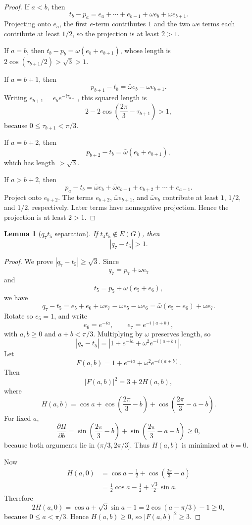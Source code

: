 \documentclass[11pt]{article}
\newtheorem{lemma}{Lemma}
\begin{document}
\begin{proof}
If $a<b$, then
\[
  t_b-p_a=e_a+\cdots+e_{b-1}+\omega e_b+\omega e_{b+1}.
\]
Projecting onto $e_a$, the first $e$-term contributes $1$ and the two $\omega e$ terms each contribute at least $1/2$, so the projection is at least $2>1$.

If $a=b$, then $t_b-p_b=\omega(e_b+e_{b+1})$, whose length is $2\cos(\tau_{b+1}/2)>\sqrt3>1$.

If $a=b+1$, then
\[
  p_{b+1}-t_b=\bar\omega e_b-\omega e_{b+1}.
\]
Writing $e_{b+1}=e_b e^{-i\tau_{b+1}}$, this squared length is
\[
  2-2\cos\left(\frac{2\pi}{3}-\tau_{b+1}\right)>1,
\]
because $0\le\tau_{b+1}<\pi/3$.

If $a=b+2$, then
\[
  p_{b+2}-t_b=\bar\omega(e_b+e_{b+1}),
\]
which has length $>\sqrt3$.

If $a>b+2$, then
\[
  p_a-t_b=\bar\omega e_b+\bar\omega e_{b+1}+e_{b+2}+\cdots+e_{a-1}.
\]
Project onto $e_{b+2}$. The terms $e_{b+2}$, $\bar\omega e_{b+1}$, and $\bar\omega e_b$ contribute at least $1$, $1/2$, and $1/2$, respectively. Later terms have nonnegative projection. Hence the projection is at least $2>1$.
\end{proof}

\begin{lemma}[$q_7t_5$ separation]\label{lem:q7t5}
If $t_4t_5\notin E(G)$, then
\[
  |q_7-t_5|>1.
\]
\end{lemma}

\begin{proof}
We prove $|q_7-t_5|\ge\sqrt3$. Since
\[
  q_7=p_7+\omega e_7
\]
and
\[
  t_5=p_5+\omega(e_5+e_6),
\]
we have
\[
  q_7-t_5=e_5+e_6+\omega e_7-\omega e_5-\omega e_6=\bar\omega(e_5+e_6)+\omega e_7.
\]
Rotate so $e_5=1$, and write
\[
  e_6=e^{-ia},\qquad e_7=e^{-i(a+b)},
\]
with $a,b\ge0$ and $a+b<\pi/3$. Multiplying by $\omega$ preserves length, so
\[
  |q_7-t_5|=|1+e^{-ia}+\omega^2e^{-i(a+b)}|.
\]
Let
\[
  F(a,b)=1+e^{-ia}+\omega^2e^{-i(a+b)}.
\]
Then
\[
  |F(a,b)|^2=3+2H(a,b),
\]
where
\[
  H(a,b)=\cos a+\cos\left(\frac{2\pi}{3}-b\right)+\cos\left(\frac{2\pi}{3}-a-b\right).
\]
For fixed $a$,
\[
  \frac{\partial H}{\partial b}=\sin\left(\frac{2\pi}{3}-b\right)+\sin\left(\frac{2\pi}{3}-a-b\right)\ge0,
\]
because both arguments lie in $(\pi/3,2\pi/3]$. Thus $H(a,b)$ is minimized at $b=0$.

Now
\[
\begin{aligned}
  H(a,0)
  &=\cos a-\frac12+\cos\left(\frac{2\pi}{3}-a\right)\\
  &=\frac12\cos a-\frac12+\frac{\sqrt3}{2}\sin a.
\end{aligned}
\]
Therefore
\[
  2H(a,0)=\cos a+\sqrt3\sin a-1=2\cos(a-\pi/3)-1\ge0,
\]
because $0\le a<\pi/3$. Hence $H(a,b)\ge0$, so $|F(a,b)|^2\ge3$.
\end{proof}
\end{document}
